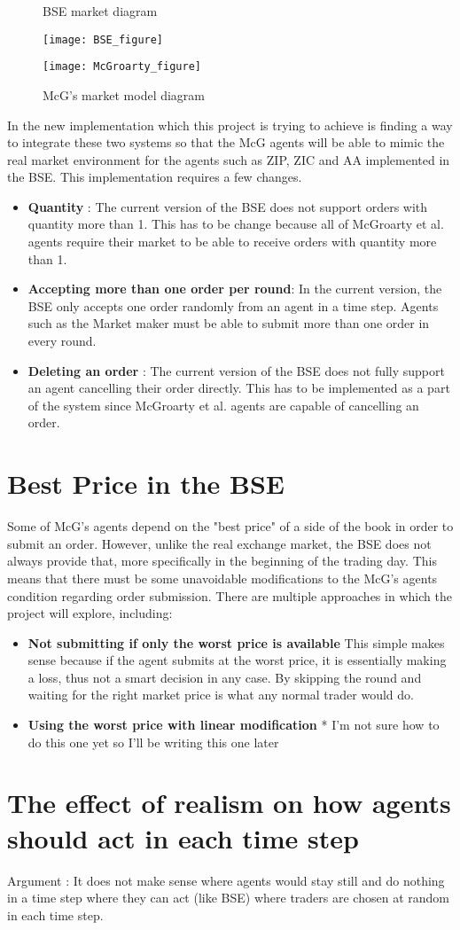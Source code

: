 \begin{figure}[h]
\caption{BSE market diagram} 
\texttt{[image: BSE\_figure]}
\caption{McG's market model diagram} 
\texttt{[image: McGroarty\_figure]}
\end{figure} 

In the new implementation which this project is trying to achieve is finding a way to integrate these two systems so that the McG agents will be able to mimic the real market environment for the agents such as ZIP, ZIC and AA implemented in the BSE. This implementation requires a few changes.

\begin{itemize}
    \item  \textbf{Quantity} : The current version of the BSE does not support orders with quantity more than 1. This has to be change because all of McGroarty et al. agents require their market to be able to receive orders with quantity more than 1. 
    \item  \textbf{Accepting more than one order per round}: In the current version, the BSE only accepts one order randomly from an agent in a time step. Agents such as the Market maker must be able to submit more than one order in every round. 
    \item \textbf{Deleting an order} : The current version of the BSE does not fully support an agent cancelling their order directly. This has to be implemented as a part of the system since McGroarty et al. agents are capable of cancelling an order.
\end{itemize} 

\section{Best Price in the BSE}
Some of McG's agents depend on the "best price" of a side of the book in order to submit an order. However, unlike the real exchange market, the BSE does not always provide that, more specifically in the beginning of the trading day. This means that there must be some unavoidable modifications to the McG's agents condition regarding order submission. There are multiple approaches in which the project will explore, including:

\begin{itemize}
    \item \textbf{Not submitting if only the worst price is available} This simple makes sense because if the agent submits at the worst price, it is essentially making a loss, thus not a smart decision in any case. By skipping the round and waiting for the right market price is what any normal trader would do. 
    
    \item \textbf{Using the worst price with linear modification} * I'm not sure how to do this one yet so I'll be writing this one later 
\end{itemize} 

\section{The effect of realism on how agents should act in each time step}
Argument : It does not make sense where agents would stay still and do nothing in a time step where they can act (like BSE) where traders are chosen at random in each time step. 

%  